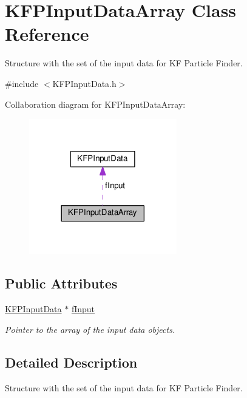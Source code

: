 \hypertarget{structKFPInputDataArray}{}\section{K\+F\+P\+Input\+Data\+Array Class Reference}
\label{structKFPInputDataArray}


Structure with the set of the input data for KF Particle Finder.  




{\ttfamily \#include $<$K\+F\+P\+Input\+Data.\+h$>$}



Collaboration diagram for K\+F\+P\+Input\+Data\+Array\+:
\nopagebreak
\begin{figure}[H]
\begin{center}
\leavevmode
\includegraphics[width=182pt]{structKFPInputDataArray__coll__graph}
\end{center}
\end{figure}
\subsection*{Public Attributes}
\begin{DoxyCompactItemize}
\item 
\hyperlink{classKFPInputData}{K\+F\+P\+Input\+Data} $\ast$ \hyperlink{structKFPInputDataArray_ae22c5ff3cb181d5b676838cef57ae4c1}{f\+Input}\hypertarget{structKFPInputDataArray_ae22c5ff3cb181d5b676838cef57ae4c1}{}\label{structKFPInputDataArray_ae22c5ff3cb181d5b676838cef57ae4c1}

\begin{DoxyCompactList}\small\item\em Pointer to the array of the input data objects. \end{DoxyCompactList}\end{DoxyCompactItemize}


\subsection{Detailed Description}
Structure with the set of the input data for KF Particle Finder. 

